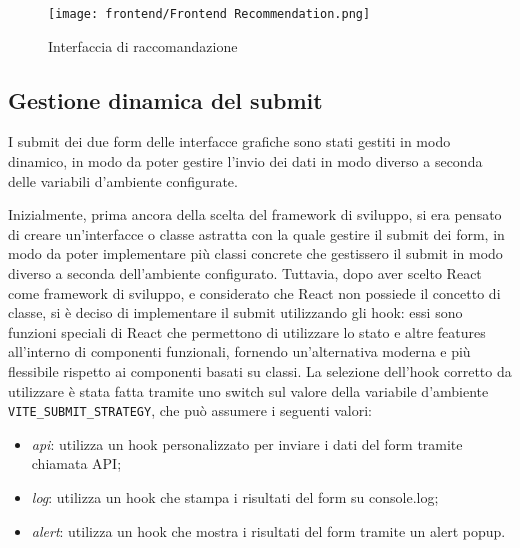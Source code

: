 \begin{figure}[!h]
    \centering
    \texttt{[image: frontend/Frontend Recommendation.png]}
    \caption{Interfaccia di raccomandazione}
    \label{fig:frontend-recommendation}
\end{figure}


\newpage

\subsection{Gestione dinamica del submit}

I submit dei due form delle interfacce grafiche sono stati gestiti in modo dinamico, in modo da poter gestire l'invio dei dati in modo diverso a seconda delle variabili d'ambiente configurate.

Inizialmente, prima ancora della scelta del framework di sviluppo, si era pensato di creare un'interfacce o classe astratta con la quale gestire il submit dei form, in modo da poter implementare più classi concrete che gestissero il submit in modo diverso a seconda dell'ambiente configurato. Tuttavia, dopo aver scelto React come framework di sviluppo, e considerato che React non possiede il concetto di classe, si è deciso di implementare il submit utilizzando gli hook: essi sono funzioni speciali di React che permettono di utilizzare lo stato e altre features all'interno di componenti funzionali, fornendo un'alternativa moderna e più flessibile rispetto ai componenti basati su classi.
La selezione dell'hook corretto da utilizzare è stata fatta tramite uno switch sul valore della variabile d'ambiente \texttt{VITE\_SUBMIT\_STRATEGY}, che può assumere i seguenti valori:
\begin{itemize}
    \item \emph{api}: utilizza un hook personalizzato per inviare i dati del form tramite chiamata API;
    \item \emph{log}: utilizza un hook che stampa i risultati del form su console.log;
    \item \emph{alert}: utilizza un hook che mostra i risultati del form tramite un alert popup.
\end{itemize}

